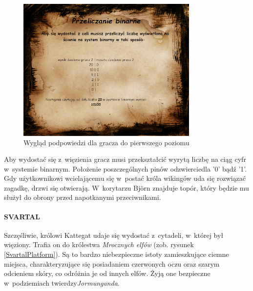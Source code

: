 \documentclass[12pt,a4paper,oneside]{book}
\theoremstyle{definition}
\numberwithin{equation}{chapter}
\begin{document}
\begin{figure}[hpt!]
        \centering
        \includegraphics[width=0.8\textwidth]{podpowiedzi/helper_image.png}
        \caption{Wygląd podpowiedzi dla gracza do pierwszego poziomu}
        \label{Helper}
    \end{figure}

\par Aby wydostać się z~więzienia gracz musi przekształcić wyrytą liczbę na ciąg cyfr w~systemie binarnym. Położenie poszczególnych pinów odzwierciedla '0' bądź '1'. Gdy użytkownikowi wcielającemu się w~postać króla wikingów uda się rozwiązać zagadkę, drzwi się otwierają. W~korytarzu Björn znajduje topór, który będzie mu służył do obrony przed napotkanymi przeciwnikami.

\paragraph{SVARTAL}\hfill \break

\par Szczęśliwie, królowi Kattegat udaje się wydostać z~cytadeli, w~której był więziony. Trafia on do królestwa \textit{Mrocznych elfów} (zob. rysunek \ref{SvartalPlatform}). Są to bardzo niebezpieczne istoty zamieszkujące ciemne miejsca, charakteryzujące się posiadaniem czerwonych oczu oraz szarym odcieniem skóry, co odróżnia je od innych elfów. Żyją one bezpieczne w~podziemiach twierdzy\textit{Jormunganda}. 
\end{document}
